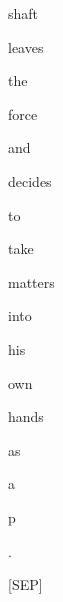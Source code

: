 \documentclass[varwidth=150mm]{standalone}
\begin{document}
\begin{CJK*}{UTF8}{gbsn}
{{{\colorbox{red!4.480531692504883}{\strut shaft} \colorbox{red!1.0777137279510498}{\strut leaves} \colorbox{red!7.62485408782959}{\strut the} \colorbox{red!1.7911558151245117}{\strut force} \colorbox{red!0.0}{\strut and} \colorbox{red!2.1962599754333496}{\strut decides} \colorbox{red!0.0}{\strut to} \colorbox{red!0.0}{\strut take} \colorbox{red!0.0}{\strut matters} \colorbox{red!0.0}{\strut into} \colorbox{red!0.0}{\strut his} \colorbox{red!0.0}{\strut own} \colorbox{red!1.4232499599456787}{\strut hands} \colorbox{red!0.0}{\strut as} \colorbox{red!3.970202684402466}{\strut a} \colorbox{red!3.353846788406372}{\strut p} \colorbox{red!16.486011505126953}{\strut .} \colorbox{red!4.103770732879639}{\strut [SEP]}
}}}
\end{CJK*}
\end{document}

